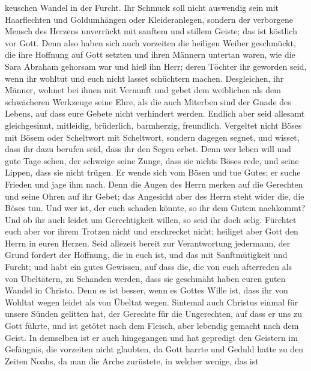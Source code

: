 keuschen Wandel in der Furcht.  Ihr Schmuck soll nicht
auswendig sein mit Haarflechten und Goldumhängen oder Kleideranlegen,
 sondern der verborgene Mensch des Herzens unverrückt mit
sanftem und stillem Geiste; das ist köstlich vor Gott.  Denn
also haben sich auch vorzeiten die heiligen Weiber geschmückt, die ihre
Hoffnung auf Gott setzten und ihren Männern untertan waren, 
wie die Sara Abraham gehorsam war und hieß ihn Herr; deren Töchter ihr
geworden seid, wenn ihr wohltut und euch nicht lasset schüchtern machen.
 Desgleichen, ihr Männer, wohnet bei ihnen mit Vernunft und
gebet dem weiblichen als dem schwächeren Werkzeuge seine Ehre, als die
auch Miterben sind der Gnade des Lebens, auf dass eure Gebete nicht
verhindert werden.  Endlich aber seid allesamt
gleichgesinnt, mitleidig, brüderlich, barmherzig, freundlich.
 Vergeltet nicht Böses mit Bösem oder Scheltwort mit
Scheltwort, sondern dagegen segnet, und wisset, dass ihr dazu berufen
seid, dass ihr den Segen erbet.  Denn wer leben will und
gute Tage sehen, der schweige seine Zunge, dass sie nichts Böses rede,
und seine Lippen, dass sie nicht trügen.  Er wende sich vom
Bösen und tue Gutes; er suche Frieden und jage ihm nach. 
Denn die Augen des Herrn merken auf die Gerechten und seine Ohren auf
ihr Gebet; das Angesicht aber des Herrn steht wider die, die Böses tun.
 Und wer ist, der euch schaden könnte, so ihr dem Gutem
nachkommt?  Und ob ihr auch leidet um Gerechtigkeit willen,
so seid ihr doch selig. Fürchtet euch aber vor ihrem Trotzen nicht und
erschrecket nicht;  heiliget aber Gott den Herrn in euren
Herzen. Seid allezeit bereit zur Verantwortung jedermann, der Grund
fordert der Hoffnung, die in euch ist,  und das mit
Sanftmütigkeit und Furcht; und habt ein gutes Gewissen, auf dass die,
die von euch afterreden als von Übeltätern, zu Schanden werden, dass sie
geschmäht haben euren guten Wandel in Christo.  Denn es ist
besser, wenn es Gottes Wille ist, dass ihr von Wohltat wegen leidet als
von Übeltat wegen.  Sintemal auch Christus einmal für
unsere Sünden gelitten hat, der Gerechte für die Ungerechten, auf dass
er uns zu Gott führte, und ist getötet nach dem Fleisch, aber lebendig
gemacht nach dem Geist.  In demselben ist er auch
hingegangen und hat gepredigt den Geistern im Gefängnis, 
die vorzeiten nicht glaubten, da Gott harrte und Geduld hatte zu den
Zeiten Noahs, da man die Arche zurüstete, in welcher wenige, das ist
